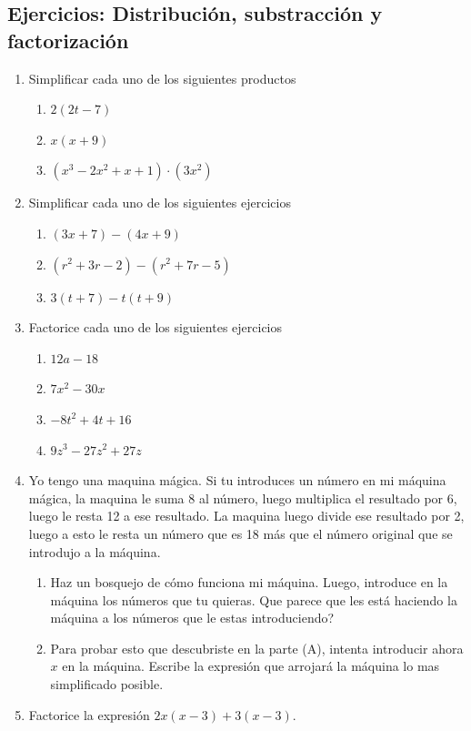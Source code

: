 \newpage
\begin{center}
	\vspace{-1cm}
	\subsection{ Ejercicios: Distribución, substracción y factorización }
\end{center}	
\begin{enumerate}		
	\item Simplificar cada uno de los siguientes productos
	\begin{multicols}{2}
		\begin{enumerate}[label=(\Alph*)]
			\item $2(2t-7)$
			\item $x(x+9)$
			\item $(x^3 -2x^2 +x +1)\cdot (3x^2)$
		\end{enumerate}
	\end{multicols}
	\item Simplificar cada uno de los siguientes ejercicios
	\begin{multicols}{2}
		\begin{enumerate}[label=(\Alph*)]
			\item $(3x+7)-(4x+9)$
			\item $(r^2 +3r -2) - (r^2+7r-5)$
			\item $3(t+7)-t(t+9)$
		\end{enumerate}
	\end{multicols}
	\item Factorice cada uno de los siguientes ejercicios
	\begin{multicols}{2}
		\begin{enumerate}[label=(\Alph*)]
			\item $12a-18$
			\item $7x^2-30x$
			\item $-8t^2+4t+16$
			\item $9z^3 -27z^2 + 27z$
		\end{enumerate}
	\end{multicols}
	\item Yo tengo una maquina mágica. Si tu introduces un número en mi máquina mágica, la maquina le suma 8 al número, luego multiplica el resultado por 6, luego le resta 12 a ese resultado. La maquina luego divide ese resultado por 2, luego a esto le resta un número que es 18 más que el número original que se introdujo a la máquina.
	\begin{enumerate}[label=(\Alph*)]
		\item Haz un bosquejo de cómo funciona mi máquina. Luego, introduce en la máquina los números que tu quieras. Que parece que les está haciendo la máquina a los números que le estas introduciendo? 
		\item Para probar esto que descubriste en la parte (A), intenta introducir ahora $x$ en la máquina. Escribe la expresión que arrojará la máquina lo mas simplificado posible.
	\end{enumerate}
	
	\item Factorice la expresión $2x(x-3) + 3(x-3)$.
	
\end{enumerate}
